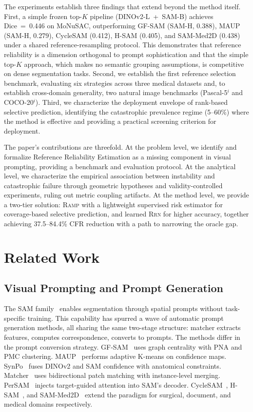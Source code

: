 \documentclass[10pt,twocolumn,letterpaper]{article}
\newcommand{\RAMP}{\textsc{Ramp}}
\newcommand{\RRN}{\textsc{Rrn}}
\begin{document}
The experiments establish three findings that extend beyond the method
itself. First, a simple frozen top-$K$ pipeline (DINOv2-L~+~SAM-B) achieves
Dice~=~0.446 on MoNuSAC, outperforming GF-SAM (SAM-H, 0.388), MAUP (SAM-H,
0.279), CycleSAM (0.412), H-SAM (0.405), and SAM-Med2D (0.438) under
a shared reference-resampling protocol. This demonstrates that reference
reliability is a dimension orthogonal to prompt sophistication and that
the simple top-$K$ approach, which makes no semantic grouping assumptions,
is competitive on dense segmentation tasks. Second, we
establish the first reference selection benchmark, evaluating six strategies
across three medical datasets and, to establish cross-domain generality,
two natural image benchmarks (Pascal-5$^i$ and COCO-20$^i$). Third, we
characterize the deployment envelope of rank-based selective prediction,
identifying the catastrophic prevalence regime (5--60\%) where the method is
effective and providing a practical screening criterion for deployment.

The paper's contributions are threefold. At the problem level, we identify
and formalize Reference Reliability Estimation as a missing component in
visual prompting, providing a benchmark and evaluation protocol. At the
analytical level, we characterize the empirical association between
instability and catastrophic failure through geometric hypotheses and
validity-controlled experiments, ruling out metric coupling artifacts.
At the method level, we provide a two-tier solution:
\RAMP{} with a lightweight supervised risk estimator for coverage-based
selective prediction, and learned \RRN{} for
higher accuracy, together achieving 37.5--84.4\% CFR reduction with a path to
narrowing the oracle gap.

\section{Related Work}

\subsection{Visual Prompting and Prompt Generation}

The SAM family~\cite{kirillov2023sam,ravi2024sam2} enables segmentation
through spatial prompts without task-specific training. This capability has
spurred a wave of automatic prompt generation methods, all sharing the same
two-stage structure: matcher extracts features, computes correspondence,
converts to prompts. The methods differ in the prompt conversion strategy.
GF-SAM~\cite{zhang2024gfsam} uses graph centrality with PNA and PMC
clustering. MAUP~\cite{zhu2025maup} performs adaptive K-means on confidence
maps. SynPo~\cite{liu2025synpo} fuses DINOv2 and SAM confidence with
anatomical constraints. Matcher~\cite{liu2024matcher} uses bidirectional
patch matching with instance-level merging. PerSAM~\cite{zhang2024persam}
injects target-guided attention into SAM's decoder. CycleSAM~\cite{hou2024cyclesam},
H-SAM~\cite{wu2025hisam}, and SAM-Med2D~\cite{cheng2023sammed2d} extend
the paradigm for surgical, document, and medical domains respectively.
\end{document}
